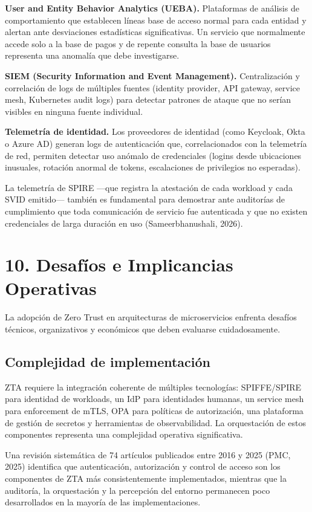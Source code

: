 \documentclass[12pt,a4paper]{article}
\begin{document}
\textbf{User and Entity Behavior Analytics (UEBA).} Plataformas de análisis de comportamiento que establecen líneas base de acceso normal para cada entidad y alertan ante desviaciones estadísticas significativas. Un servicio que normalmente accede solo a la base de pagos y de repente consulta la base de usuarios representa una anomalía que debe investigarse.

\textbf{SIEM (Security Information and Event Management).} Centralización y correlación de logs de múltiples fuentes (identity provider, API gateway, service mesh, Kubernetes audit logs) para detectar patrones de ataque que no serían visibles en ninguna fuente individual.

\textbf{Telemetría de identidad.} Los proveedores de identidad (como Keycloak, Okta o Azure AD) generan logs de autenticación que, correlacionados con la telemetría de red, permiten detectar uso anómalo de credenciales (logins desde ubicaciones inusuales, rotación anormal de tokens, escalaciones de privilegios no esperadas).

La telemetría de SPIRE —que registra la atestación de cada workload y cada SVID emitido— también es fundamental para demostrar ante auditorías de cumplimiento que toda comunicación de servicio fue autenticada y que no existen credenciales de larga duración en uso (Sameerbhanushali, 2026).



\section{10. Desafíos e Implicancias Operativas}

La adopción de Zero Trust en arquitecturas de microservicios enfrenta desafíos técnicos, organizativos y económicos que deben evaluarse cuidadosamente.

\subsection{Complejidad de implementación}

ZTA requiere la integración coherente de múltiples tecnologías: SPIFFE/SPIRE para identidad de workloads, un IdP para identidades humanas, un service mesh para enforcement de mTLS, OPA para políticas de autorización, una plataforma de gestión de secretos y herramientas de observabilidad. La orquestación de estos componentes representa una complejidad operativa significativa.

Una revisión sistemática de 74 artículos publicados entre 2016 y 2025 (PMC, 2025) identifica que autenticación, autorización y control de acceso son los componentes de ZTA más consistentemente implementados, mientras que la auditoría, la orquestación y la percepción del entorno permanecen poco desarrollados en la mayoría de las implementaciones.
\end{document}
